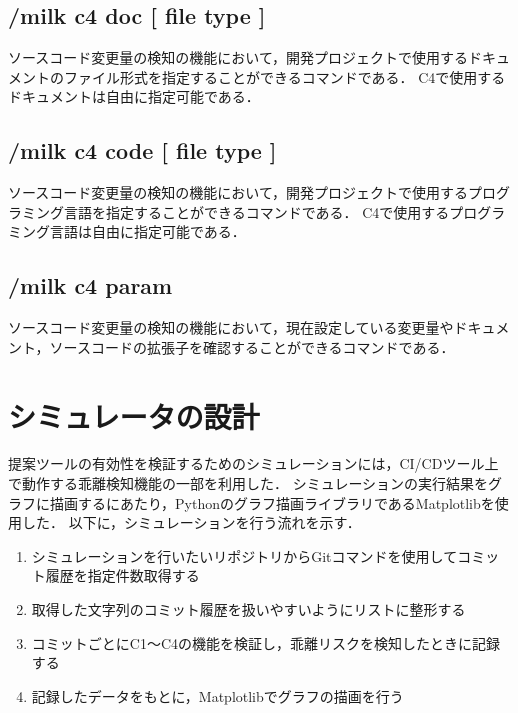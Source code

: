 \subsection*{/milk c4 doc [ file type ]}
ソースコード変更量の検知の機能において，開発プロジェクトで使用するドキュメントのファイル形式を指定することができるコマンドである．
C4で使用するドキュメントは自由に指定可能である．

\subsection*{/milk c4 code [ file type ]}
ソースコード変更量の検知の機能において，開発プロジェクトで使用するプログラミング言語を指定することができるコマンドである．
C4で使用するプログラミング言語は自由に指定可能である．

\subsection*{/milk c4 param}
ソースコード変更量の検知の機能において，現在設定している変更量やドキュメント，ソースコードの拡張子を確認することができるコマンドである．

\section{シミュレータの設計}
提案ツールの有効性を検証するためのシミュレーションには，CI/CDツール上で動作する乖離検知機能の一部を利用した．
シミュレーションの実行結果をグラフに描画するにあたり，Pythonのグラフ描画ライブラリであるMatplotlibを使用した．
以下に，シミュレーションを行う流れを示す．
\begin{enumerate}
    \item シミュレーションを行いたいリポジトリからGitコマンドを使用してコミット履歴を指定件数取得する
    \item 取得した文字列のコミット履歴を扱いやすいようにリストに整形する
    \item コミットごとにC1〜C4の機能を検証し，乖離リスクを検知したときに記録する
    \item 記録したデータをもとに，Matplotlibでグラフの描画を行う
\end{enumerate}